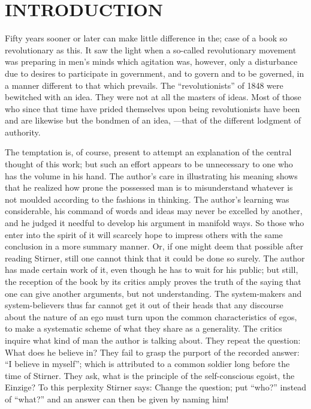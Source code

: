 
\chapter[Introduction]{\centering INTRODUCTION}

Fifty years sooner or later can make little difference in the; case of a book 
so revolutionary as this. It saw the light when a so-called revolutionary 
movement was preparing in men's minds which agitation was, however, only a 
disturbance due to desires to participate in government, and to govern and to 
be governed, in a manner different to that which prevails. The 
``revolutionists'' of 1848 were bewitched with an idea. They were not at all 
the masters of ideas. Most of those who since that time have prided themselves 
upon being revolutionists have been and are likewise but the bondmen of an 
idea, ---that of the different lodgment of authority.

The temptation is, of course, present to attempt an explanation of the central 
thought of this work; but such an effort appears to be unnecessary to one who 
has the volume in his hand. The author's care in illustrating his meaning 
shows that he realized how prone the possessed man is to misunderstand 
whatever is not moulded according to the fashions in thinking. The author's 
learning was considerable, his command of words and ideas may never be 
excelled by another, and he judged it needful to develop his argument in 
manifold ways. So those who enter into the spirit of it will scarcely hope to 
impress others with the same conclusion in a more summary manner. Or, if one 
might deem that possible after reading Stirner, still one cannot think that it 
could be done so surely. The author has made certain work of it, even though 
he has to wait for his public; but still, the reception of the book by its 
critics amply proves the truth of the saying that one can give another 
arguments, but not understanding. The system-makers and system-believers thus 
far cannot get it out of their heads that any discourse about the nature of an 
ego must turn upon the common characteristics of egos, to make a systematic 
scheme of what they share as a generality. The critics inquire what kind of 
man the author is talking about. They repeat the question: What does he 
believe in? They fail to grasp the purport of the recorded answer: ``I 
believe in myself''; which is attributed to a common soldier long before the 
time of Stirner. They ask, what is the principle of the self-conscious egoist, 
the Einzige? To this perplexity Stirner says: Change the question; put 
``who?'' instead of ``what?'' and an answer can then be given by naming 
him!

